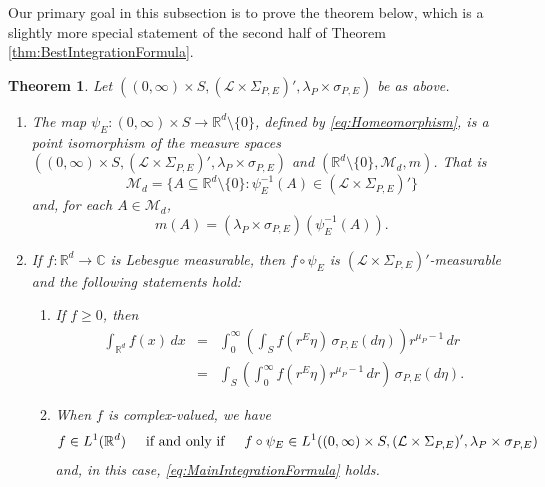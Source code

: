 \documentclass[11pt, letter]{book}
\newtheorem{theorem}{Theorem}[section]
\begin{document}
\noindent Our primary goal in this subsection is to prove the theorem below, which is a slightly more special statement of the second half of Theorem \ref{thm:BestIntegrationFormula}. 

\begin{framed}
\begin{theorem}\label{thm:MainIntegrationFormula}
Let $((0,\infty)\times S,(\mathcal{L}\times\Sigma_{P,E})',\lambda_P\times\sigma_{P,E})$ be as above.
\begin{enumerate}
\item\label{item:MainIntegrationFormula1} The map $\psi_E: (0,\infty)\times S\to\mathbb{R}^d\setminus\{0\}$, defined by \eqref{eq:Homeomorphism}, is a point isomorphism of the measure spaces $((0,\infty)\times S,(\mathcal{L}\times\Sigma_{P,E})',\lambda_P\times\sigma_{P,E})$ and $(\mathbb{R}^d\setminus\{0\},\mathcal{M}_d,m)$. That is
\begin{equation*}
\mathcal{M}_d=\{A\subseteq \mathbb{R}^d\setminus\{0\}:\psi_E^{-1}(A)\in(\mathcal{L}\times\Sigma_{P,E})'\}
\end{equation*}
and, for each $A\in\mathcal{M}_d$,
\begin{equation*}
m(A)=(\lambda_P\times\sigma_{P,E})(\psi_E^{-1}(A)).
\end{equation*}
\item\label{item:MainintegrationFormula2} If $f:\mathbb{R}^d\to\mathbb{C}$ is Lebesgue measurable, then $f\circ \psi_E$ is $(\mathcal{L}\times\Sigma_{P,E})'$-measurable and the following statements hold:
\begin{enumerate}
\item If $f\geq 0$, then
\begin{eqnarray}\label{eq:MainIntegrationFormula}
\int_{\mathbb{R}^d}f(x)\,dx&=&\int_0^\infty\left(\int_S f(r^E\eta)\,\sigma_{P,E}(d\eta)\right)r^{\mu_P-1}\,dr\nonumber\\
&=&\int_S\left(\int_0^\infty f(r^E\eta)r^{\mu_P-1}\,dr\right)\,\sigma_{P,E}(d\eta).
\end{eqnarray}
\item When $f$ is complex-valued, we have 
\begin{equation*}f\in L^1(\mathbb{R}^d)\hspace{.5cm}\mbox{if and only if}\hspace{0.5cm}f\circ\psi_E\in L^1((0,\infty)\times S,(\mathcal{L}\times \Sigma_{P,E})',\lambda_P\times\sigma_{P,E})
\end{equation*}
and, in this case, \eqref{eq:MainIntegrationFormula} holds.
\end{enumerate}
\end{enumerate}
\end{theorem}
\end{framed}
\end{document}
